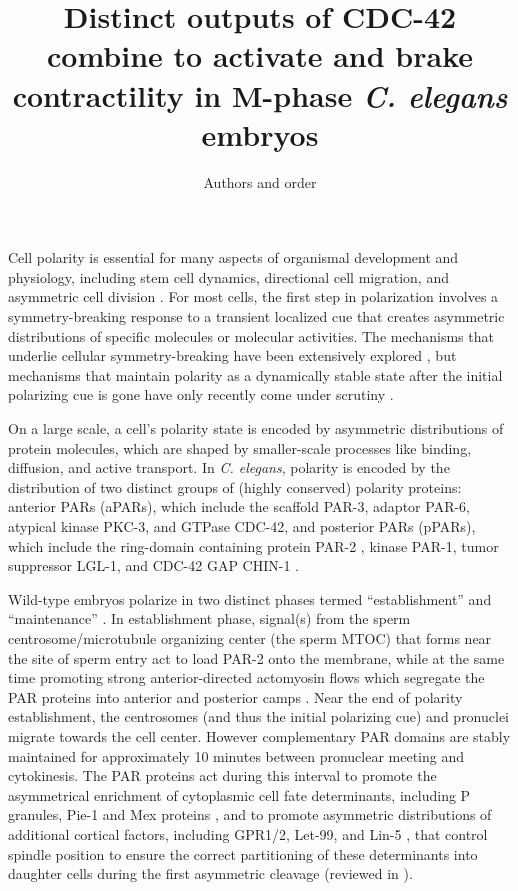 \documentclass[11pt]{article}
\title{Distinct outputs of CDC-42 combine to activate and brake contractility in M-phase \emph{C. elegans} embryos }
\author{Authors and order \vspace{-0.75 cm}}
\newcommand{\6}[1]{#1_{\text{6}}}
\newcommand{\3}[1]{#1_{\text{3}}}
\begin{document}
\maketitle
\iffalse
Cell polarity is essential for many aspects of organismal development and physiology, including stem cell dynamics, directional cell migration, and asymmetric cell division \cite{dewey2015cell, goldstein2007proteins, ierushalmi2021cytoskeletal, maitre2016asymmetric}. For most cells, the first step in polarization involves a symmetry-breaking response to a transient localized cue that creates asymmetric distributions of specific molecules or molecular activities. The mechanisms that underlie cellular symmetry-breaking have been extensively explored \cite{li2010symmetry}, but mechanisms that maintain polarity as a dynamically stable state after the initial polarizing cue is gone have only recently come under scrutiny \cite{sailer2015dynamic, gross2019guiding}.

On a large scale, a cell's polarity state is encoded by asymmetric distributions of protein molecules, which are shaped by smaller-scale processes like binding, diffusion, and active transport. In \emph{C. elegans}, polarity is encoded by the distribution of two distinct groups of (highly conserved) polarity proteins: anterior PARs (aPARs), which include the scaffold PAR-3, adaptor PAR-6, atypical kinase PKC-3, and GTPase CDC-42, and posterior PARs (pPARs), which include the ring-domain containing protein PAR-2 \cite{bland2023optimized}, kinase PAR-1, tumor suppressor LGL-1, and CDC-42 GAP CHIN-1 \cite{lang2017proteins}. 

Wild-type embryos polarize in two distinct phases termed ``establishment'' and ``maintenance'' \cite{cuenca2003polarization}. In establishment phase, signal(s) from the sperm centrosome/microtubule organizing center (the sperm MTOC) that forms near the site of sperm entry act to load PAR-2 onto the membrane, while at the same time promoting strong anterior-directed actomyosin flows which segregate the PAR proteins into anterior and posterior camps \cite{munro2004cortical, gan2021mechanochemical}. Near the end of polarity establishment, the centrosomes (and thus the initial polarizing cue) and pronuclei migrate towards the cell center.  However complementary PAR domains are stably maintained for approximately 10 minutes between pronuclear meeting and cytokinesis. The PAR proteins act during this interval to promote the asymmetrical enrichment of cytoplasmic cell fate determinants, including P granules, Pie-1 and Mex proteins \cite{cheeks2004c, cuenca2003polarization}, and to promote asymmetric distributions of additional cortical factors, including GPR1/2, Let-99, and Lin-5 \cite{park2008dynamic, tsou2002let}, that control spindle position to ensure the correct partitioning of these determinants into daughter cells during the first asymmetric cleavage (reviewed in \cite{gonczy2005asymmetric}).
\end{document}
